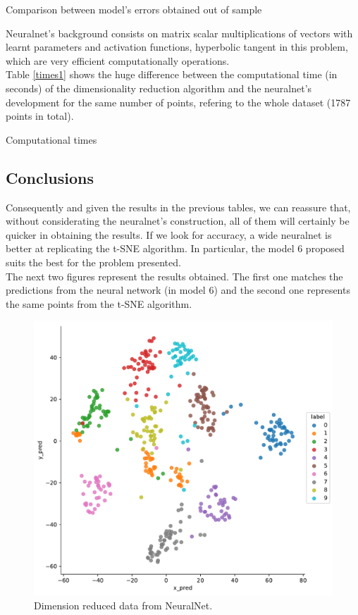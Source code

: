 \documentclass[a4paper,11pt,spanish]{report}
\begin{document}
\begin{table}[h]
\vspace{20px}
\centering

\caption{\label{metrics1}Comparison between model's errors obtained out of sample}
\end{table}

Neuralnet's background consists on matrix scalar multiplications of vectors with learnt parameters and activation functions, hyperbolic tangent in this problem, which are very efficient computationally operations.\\
Table \ref{times1} shows the huge difference between the computational time (in seconds) of the dimensionality reduction algorithm and the neuralnet's development for the same number of points, refering to the whole dataset (1787 points in total).

\begin{table}[h]
\vspace{10px}
\centering

\caption{\label{times1}Computational times}
\end{table}

\subsection{Conclusions}
\label{ssec:conc1}

Consequently and given the results in the previous tables, we can reassure that, without considerating the neuralnet's construction, all of them will certainly be quicker in obtaining the results. If we look for accuracy, a wide neuralnet is better at replicating the t-SNE algorithm. In particular, the model 6 proposed suits the best for the problem presented.\\
The next two figures represent the results obtained. The first one matches the predictions from the neural network (in model 6) and the second one represents the same points from the t-SNE algorithm.

\begin{figure}
\centering
\includegraphics[width=12cm]{figures/app1plotpredictions.pdf}
\caption{\label{figureNN}Dimension reduced data from NeuralNet.}
\end{figure}
\end{document}
